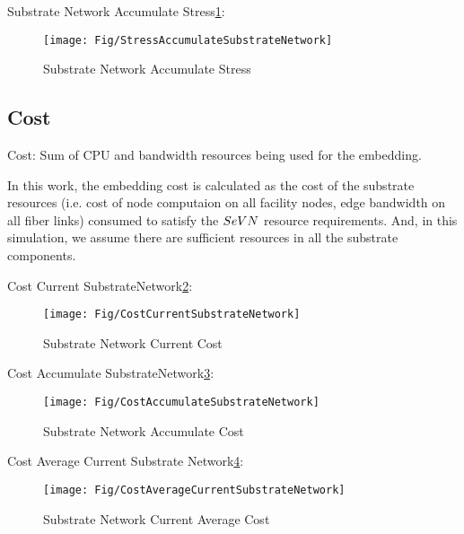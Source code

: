 Substrate Network Accumulate Stress\ref{fig:StressAccumulateSubstrateNetwork}:
\begin{figure}
  \centering
  \texttt{[image: Fig/StressAccumulateSubstrateNetwork]}\\
  \caption{Substrate Network Accumulate Stress}\label{fig:StressAccumulateSubstrateNetwork}
\end{figure}




\subsection{Cost}
Cost: Sum of CPU and bandwidth resources being used for the embedding.

In this work, the embedding cost is calculated as the cost of the substrate resources (i.e. cost of node computaion on all facility nodes, edge bandwidth on all fiber links) consumed to satisfy the $SeVN$ resource requirements. And, in this simulation, we assume there are sufficient resources in all the substrate components.


Cost Current SubstrateNetwork\ref{fig:CostCurrentSubstrateNetwork}:
\begin{figure}
  \centering
  \texttt{[image: Fig/CostCurrentSubstrateNetwork]}\\
  \caption{Substrate Network Current Cost}\label{fig:CostCurrentSubstrateNetwork}
\end{figure}

Cost Accumulate SubstrateNetwork\ref{fig:CostAccumulateSubstrateNetwork}:
\begin{figure}
  \centering
  \texttt{[image: Fig/CostAccumulateSubstrateNetwork]}\\
  \caption{Substrate Network Accumulate Cost}\label{fig:CostAccumulateSubstrateNetwork}
\end{figure}

Cost Average Current Substrate Network\ref{fig:CostAverageCurrentSubstrateNetwork}:
\begin{figure}
  \centering
  \texttt{[image: Fig/CostAverageCurrentSubstrateNetwork]}\\
  \caption{Substrate Network Current Average Cost}\label{fig:CostAverageCurrentSubstrateNetwork}
\end{figure}

